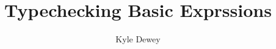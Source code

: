 \documentclass[10pt]{article}
\begin{document}
\title{Typechecking Basic Exprssions}
\author{Kyle Dewey}
\date{}
\maketitle




\end{document}
